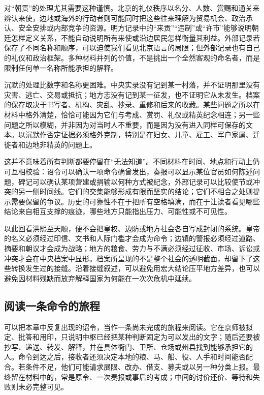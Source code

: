 对“朝贡”的处理尤其需要这种谨慎。北京的礼仪秩序以名分、人数、赏赐和通关来辨认来使，边地或海外的行动者则可能同时把这些往来理解为贸易机会、政治承认、安全安排或内部竞争的资源。明方记录中的“来贡”“违制”或“许市”能够说明朝廷怎样定义关系，不能自动说明所有来使或沿边居民怎样衡量其利益。外部记录若保存了不同名称和顺序，可以迫使我们看见北京语言的局限；但外部记录也有自己的礼仪和政治框架。多种材料并列的价值，不是挑出一个全然客观的命名者，而是限制任何单一名称所能承担的解释。

沉默的处理比数字和名称更困难。中央实录没有记到某一村落，并不证明那里没有灾害、逃亡、交易或抵抗；地方志没有记到某一征发，也不证明它从未发生。档案的保存取决于书写者、机构、灾乱、抄录、重修和后来的收藏。某些问题之所以在材料中格外清楚，恰恰可能因为它们与考成、赏罚、礼仪或精英纪念相连；另一些问题之所以模糊，并非因为对当时人不重要，而是因为没有进入同样可保存的文本。以沉默作否定证据必须格外克制，特别是在妇女、儿童、雇工、军户家属、迁徙者和边地非精英的问题上。

这并不意味着所有判断都要停留在“无法知道”。不同材料在时间、地点和行动上仍可互相校验：诏令可以确认一项命令确曾发出，奏报可以显示某位官员如何陈述问题，碑记可以确认某项营建或捐输以何种方式被纪念，外部记录可以比较使节或冲突的另一侧时间线。它们的交集能够形成有限而坚实的结论；它们不相合之处则提示需要保留的争议。历史的可靠性不在于把所有空格填满，而在于让读者看见哪些结论来自相互支撑的痕迹，哪些地方只能指出压力、可能性或不可见性。

以此回看洪熙至天顺，便不会把皇权、边防或地方社会各自写成封闭的系统。皇帝的名义必须经过印信、文书和人际门槛才会成为命令；边镇的警报必须经过道路、摘要和朝议才会成为战略；地方的粮食、劳力与不满必须经过征收、市场、诉讼或冲突才会在中央档案中显形。档案所呈现的不是整个社会的透明截面，却留下了这些转换发生过的接缝。沿着接缝叙述，可以避免用宏大结论压平地方差异，也可以避免因材料残缺而放弃解释国家为何能在一次次危机中延续。

\subsection{阅读一条命令的旅程}

可以把本章中反复出现的诏令，当作一条尚未完成的旅程来阅读。它在京师被拟定、批答和用印，只说明中枢已经把某种判断固定为可以发出的文字；随后还要被抄写、递送、转发、解释，并在具体衙门、卫所、仓场或州县找到能够承担它的人。命令到达之后，接收者还须决定本地的粮、马、船、役、人手和时间能否配合。若条件不足，他们可能请求展限、改办、借支、募夫或以另一种分类上报。最终留在材料中的，常是原令、一次奏报或事后的考成；中间的讨价还价、等待和失败则未必完整可见。

